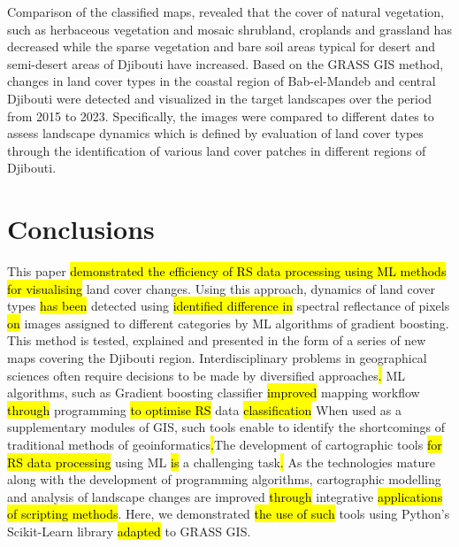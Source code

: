 \documentclass[jimaging,article,submit,pdftex,moreauthors]{Definitions/mdpi}
\begin{document}
Comparison of the classified maps, revealed that the cover of natural vegetation, such as herbaceous vegetation and mosaic shrubland, croplands and grassland has decreased while the sparse vegetation and bare soil areas typical for desert and semi-desert areas of Djibouti have increased. Based on the GRASS GIS method, changes in land cover types in the coastal region of Bab-el-Mandeb and central Djibouti were detected and visualized in the target landscapes over the period from 2015 to 2023. Specifically, the images were compared to different dates to assess landscape dynamics which is defined by evaluation of land cover types through the identification of various land cover patches in different regions of Djibouti.

\section{Conclusions}

This paper \hl{demonstrated the efficiency of RS data processing using ML methods for visualising} land cover changes. Using this approach, dynamics of land cover types \hl{has been} detected using\hl{ identified difference in} spectral reflectance of pixels \hl{on} images assigned to different categories by ML algorithms of gradient boosting. This method is tested, explained and presented in the form of a series of new maps covering the Djibouti region. Interdisciplinary problems in geographical sciences\hl{ }often require decisions to be made by diversified approaches\hl{.} ML algorithms, such as Gradient boosting classifier \hl{improved} mapping workflow \hl{through} programming\hl{ to optimise RS}  data \hl{classification} When used as a supplementary modules of GIS, such tools enable to identify the\hl{ }shortcomings of traditional methods of geoinformatics\hl{.}The development of cartographic tools \hl{for RS data processing }using ML \hl{is} a challenging task\hl{.} As the technologies mature along with the development of programming algorithms, cartographic modelling and analysis of landscape changes are\hl{ }improved\hl{ through }integrative \hl{applications of scripting methods}. Here, we demonstrated \hl{the use of such} tools using Python's Scikit-Learn library \hl{adapted} to\hl{ }GRASS GIS. 
\end{document}
